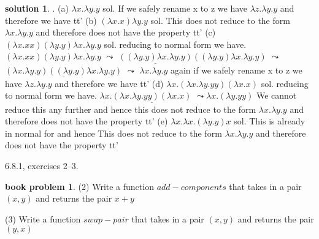 \documentclass[10pt]{article}
\theoremstyle{definition}
\newtheorem{bp}{book problem}
\newtheorem{sol}{solution}
\begin{document}
\begin{sol}.\newline
  (a) $\lambda x. \lambda y.y$ \newline
   sol. If we safely rename x to z we have $\lambda z. \lambda y.y$ and therefore we have t\textdownarrow t' \newline
  (b) $(\lambda x.x) \lambda y.y$ \newline
   sol. This does not reduce to the form $\lambda x.\lambda y.y$ and therefore does not have the property t\textdownarrow t' \newline
  (c) $( \lambda x.x x)( \lambda y.y) \lambda x. \lambda y.y$ \newline
   sol. reducing to normal form we have. \newline
   \underline{$( \lambda x.x x)( \lambda y.y) \lambda x. \lambda y.y$} \newline
   $\leadsto$ $\underline{(( \lambda y.y) \lambda x. \lambda y.y)}(( \lambda y.y) \lambda x. \lambda y.y)$ \newline
   $\leadsto$ $\underline{(\lambda x. \lambda y.y)(( \lambda y.y) \lambda x. \lambda y.y)}$ \newline
   $\leadsto$ $\lambda x. \lambda y.y$ \newline
   again if we safely rename x to z we have $\lambda z. \lambda y.y$ and therefore we have t\textdownarrow t'
   (d) $ \lambda x.( \lambda x. \lambda y.y y)( \lambda x.x)$ \newline
   sol. reducing to normal form we have. \newline
   $ \lambda x.\underline{( \lambda x. \lambda y.y y)( \lambda x.x)}$ \newline
   $\leadsto \lambda x.(\lambda y.y y)$ \newline
   We cannot reduce this any further and hence this does not reduce to the form $\lambda x.\lambda y.y$ and therefore does not have the property t\textdownarrow t' \newline
   (e) $ \lambda x.\lambda x.(\lambda y.y)x$ \newline
   sol. This is already in normal for and hence  This does not reduce to the form $\lambda x.\lambda y.y$ and therefore does not have the property t\textdownarrow t' \newline


\end{sol}

6.8.1, exercises 2--3.

\begin{bp}

  (2) Write a function $add-components$ that takes in a pair $(x,y)$ and returns the pair $x + y$

  (3) Write a function $swap-pair$ that takes in a pair $(x,y)$ and returns the pair $(y,x)$

\end{bp}
\end{document}
